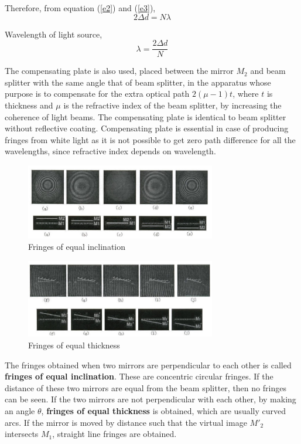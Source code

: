 \documentclass[a4paper, amsfonts, amssymb, amsmath, reprint, showkeys, nofootinbib, twoside]{revtex4-1}
\begin{document}
Therefore, from equation (\ref{e2}) and (\ref{e3}), 
\begin{equation}
2\Delta d=N\lambda
\end{equation}

Wavelength of light source,
\begin{equation}
\lambda=\frac{2\Delta d}{N}
\label{f}
\end{equation}

The compensating plate is also used, placed between the mirror $M_2$ and beam splitter with the same angle that of beam splitter, in the apparatus whose purpose is to compensate for the extra optical path $2(\mu-1)t$, where $t$ is thickness and $\mu$ is the refractive index of the beam splitter, by increasing the coherence of light beams. The compensating plate is identical to beam splitter without reflective coating.
Compensating plate is essential in case of producing fringes from white light as it is not possible to get zero path difference for all the wavelengths, since refractive index depends on wavelength.

\begin{figure}[htbp] %
   \centering
   \includegraphics[width=8.3cm]{fri1} 
   \caption{Fringes of equal inclination}
   \label{}
\end{figure}

\begin{figure}[htbp] %
   \centering
   \includegraphics[width=8.3cm]{fri2} 
   \caption{Fringes of equal thickness}
   \label{}
\end{figure}

The fringes obtained when two mirrors are perpendicular to each other is called \textbf{fringes of equal inclination}. These are concentric circular fringes. If the distance of these two mirrors are equal from the beam splitter, then no fringes can be seen. If the two mirrors are not perpendicular with each other, by making an angle $\theta$, \textbf{fringes of equal thickness} is obtained, which are usually curved arcs. If the mirror is moved by distance such that  the virtual image $M'_2$ intersects $M_1$, straight line fringes are obtained.
\end{document}
